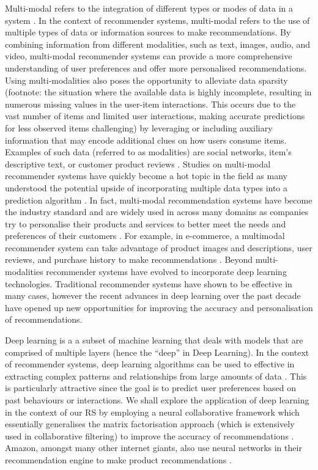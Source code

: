 Multi-modal refers to the integration of different types or modes of data in a system \citep{truong2021multi}. In the context of recommender systems, multi-modal refers to the use of multiple types of data or information sources to make recommendations. By combining information from different modalities, such as text, images, audio, and video, multi-modal recommender systems can provide a more comprehensive understanding of user preferences and offer more personalised recommendations. Using multi-modalities also poses the opportunity to alleviate data sparsity (footnote: the situation where the available data is highly incomplete, resulting in numerous missing values in the user-item interactions. This occurs due to the vast number of items and limited user interactions, making accurate predictions for less observed items challenging) by leveraging or including auxiliary information that may encode additional clues on how users consume items. Examples of such data (referred to as modalities) are social networks, item’s descriptive text, or customer product reviews \citep{truong2021multi}. Studies on multi-modal recommender systems have quickly become a hot topic in the field as many understood the potential upside of incorporating multiple data types into a prediction algorithm \citep{truong2021multi}. In fact, multi-modal recommendation systems have become the industry standard and are widely used in across many domains as companies try to personalise their products and services to better meet the needs and preferences of their customers \citep{liu2023multimodal}. For example, in e-commerce, a multimodal recommender system can take advantage of product images and descriptions, user reviews, and purchase history to make recommendations \citep{liu2023multimodal}. Beyond multi-modalities recommender systems have evolved to incorporate deep learning technologies. Traditional recommender systems have shown to be effective in many cases, however the recent advances in deep learning over the past decade have opened up new opportunities for improving the accuracy and personalisation of recommendations. 

Deep learning is a a subset of machine learning that deals with models that are comprised of multiple layers (hence the “deep” in Deep Learning). In the context of recommender systems, deep learning algorithms can be used to effective in extracting complex patterns and relationships from large amounts of data \citep{he2017neural}. This is particularly attractive since the goal is to predict user preferences based on past behaviours or interactions. We shall explore the application of deep learning in the context of our RS by employing a neural collaborative framework which essentially generalises the matrix factorisation approach (which is extensively used in collaborative filtering) to improve the accuracy of recommendations \citep{he2017neural}. Amazon, amongst many other internet giants, also use neural networks in their recommendation engine  to make product recommendations \citep{steck2021deep}. 

